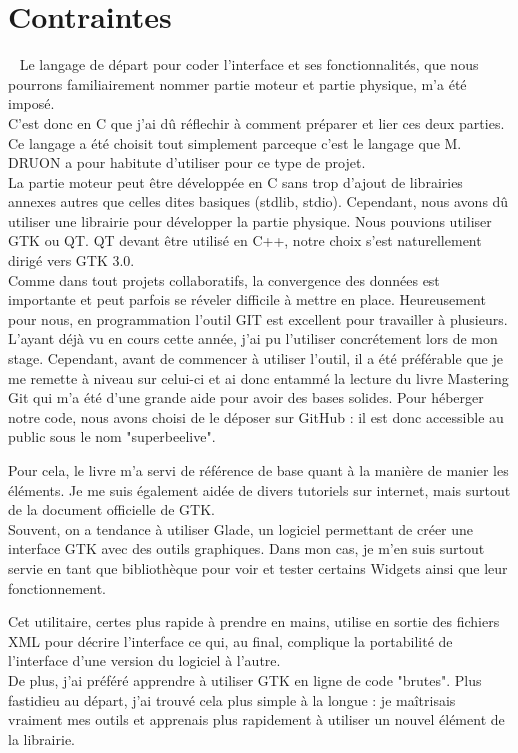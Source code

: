 \documentclass[11pt,french,a4paper]{report}
\begin{document}
    \section{Contraintes} 
Le langage de départ pour coder l'interface et ses fonctionnalités, que nous pourrons familiairement nommer partie moteur 
et partie physique, m'a été imposé. \\
C'est donc en C que j'ai dû réflechir à comment préparer et lier ces deux parties. Ce langage a été choisit tout simplement 
parceque c'est  le langage que M. DRUON a pour habitute d'utiliser pour ce type de projet. \\
La partie moteur peut être développée en C sans trop d'ajout de librairies annexes autres que celles dites basiques 
(stdlib, stdio). 
Cependant, nous avons dû utiliser une librairie pour développer la partie physique. Nous pouvions utiliser GTK ou QT. 
QT devant être utilisé en C++, notre choix s'est naturellement dirigé vers GTK 3.0. \\
Comme dans tout projets collaboratifs, la convergence des données est importante et peut parfois se réveler difficile à mettre en place. 
Heureusement pour nous, en programmation l'outil GIT est excellent pour travailler à plusieurs. L'ayant déjà vu en cours cette année,
j'ai pu l'utiliser concrétement lors de mon stage. Cependant, avant de commencer à utiliser l'outil, il a été préférable que 
je me remette à niveau sur celui-ci et ai donc entammé la lecture du livre Mastering Git %
qui m'a été d'une grande aide pour avoir des bases solides. Pour héberger notre code, nous avons choisi de le déposer sur GitHub : 
il est donc accessible au public sous le nom "superbeelive". %

Pour cela, le livre %
m'a servi de référence de base quant à la manière de manier les éléments. Je me suis également aidée de divers tutoriels sur internet,
mais surtout de la document officielle de GTK. %
\\
Souvent, on a tendance à utiliser Glade, un logiciel permettant de créer une interface GTK avec des outils graphiques. 
Dans mon cas, je m'en suis surtout servie en tant que bibliothèque pour voir et tester certains Widgets ainsi que leur fonctionnement. 

Cet utilitaire, certes plus rapide à prendre en mains, utilise en sortie des fichiers XML pour décrire l'interface ce qui, 
au final, complique la portabilité de l'interface d'une version du logiciel à l'autre. \\ 
De plus, j'ai préféré apprendre à utiliser GTK en ligne de code "brutes". Plus fastidieu au départ, 
j'ai trouvé cela plus simple à la longue : je maîtrisais vraiment mes outils et apprenais plus rapidement à utiliser 
un nouvel élément de la librairie.  
\end{document}
